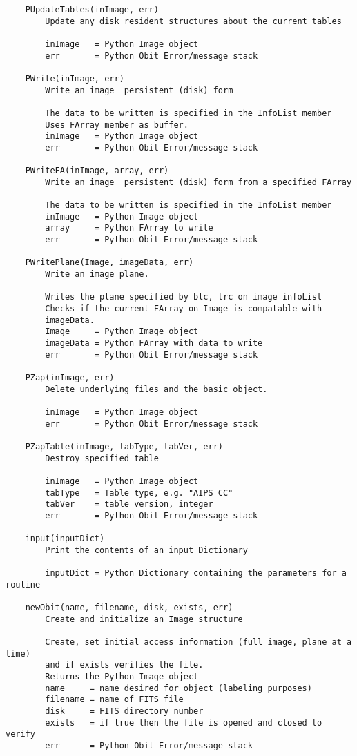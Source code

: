 \documentclass[11pt]{report}
\begin{document}
\begin{verbatim}
    PUpdateTables(inImage, err)
        Update any disk resident structures about the current tables
        
        inImage   = Python Image object
        err       = Python Obit Error/message stack
    
    PWrite(inImage, err)
        Write an image  persistent (disk) form
        
        The data to be written is specified in the InfoList member
        Uses FArray member as buffer.
        inImage   = Python Image object
        err       = Python Obit Error/message stack
    
    PWriteFA(inImage, array, err)
        Write an image  persistent (disk) form from a specified FArray
        
        The data to be written is specified in the InfoList member
        inImage   = Python Image object
        array     = Python FArray to write
        err       = Python Obit Error/message stack
    
    PWritePlane(Image, imageData, err)
        Write an image plane.
        
        Writes the plane specified by blc, trc on image infoList
        Checks if the current FArray on Image is compatable with
        imageData.
        Image     = Python Image object
        imageData = Python FArray with data to write
        err       = Python Obit Error/message stack
    
    PZap(inImage, err)
        Delete underlying files and the basic object.
        
        inImage   = Python Image object
        err       = Python Obit Error/message stack
    
    PZapTable(inImage, tabType, tabVer, err)
        Destroy specified table
        
        inImage   = Python Image object
        tabType   = Table type, e.g. "AIPS CC"
        tabVer    = table version, integer
        err       = Python Obit Error/message stack
    
    input(inputDict)
        Print the contents of an input Dictionary
        
        inputDict = Python Dictionary containing the parameters for a routine
    
    newObit(name, filename, disk, exists, err)
        Create and initialize an Image structure
        
        Create, set initial access information (full image, plane at a time)
        and if exists verifies the file.
        Returns the Python Image object
        name     = name desired for object (labeling purposes)
        filename = name of FITS file
        disk     = FITS directory number
        exists   = if true then the file is opened and closed to verify
        err      = Python Obit Error/message stack
    

\end{verbatim}
\end{document}
